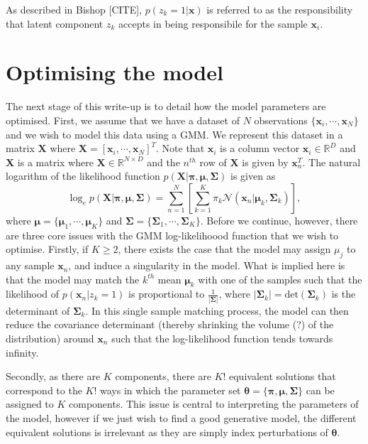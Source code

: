 \documentclass{article}
\begin{document}
As described in Bishop [CITE], $p(z_k = 1\vert \mathbf{x})$ is referred to as the responsibility that latent component $z_k$ accepts in being responsibile for the sample $\mathbf{x}_i$.

\section{Optimising the model}
The next stage of this write-up is to detail how the model parameters are optimised. First, we assume that we have a dataset of $N$ observations $\{\mathbf{x}_i, \cdots, \mathbf{x}_N\}$ and we wish to model this data using a GMM. We represent this dataset in a matrix $\mathbf{X}$ where $\mathbf{X} = \left[ \mathbf{x}_i, \cdots, \mathbf{x}_N \right]^T$. Note that $\mathbf{x}_i$ is a column vector $\mathbf{x}_i \in \mathbb{R}^D$ and $\mathbf{X}$ is a matrix where $\mathbf{X} \in \mathbb{R}^{N \times D}$ and the $n^{th}$ row of $\mathbf{X}$ is given by $\mathbf{x}_n^T$.  The natural logarithm of the likelihood function $p(\mathbf{X}\vert \boldsymbol\pi, \boldsymbol\mu, \boldsymbol\Sigma)$ is given as
\begin{equation}\label{eq:ll_function}
\log_e p(\mathbf{X}\vert \boldsymbol\pi, \boldsymbol\mu, \boldsymbol\Sigma) = \sum_{n = 1}^{N} \left[  \sum_{k=1}^{K} \pi_k \mathcal{N}(\mathbf{x}_n \vert \boldsymbol\mu_k, \boldsymbol\Sigma_k) \right],
\end{equation}
where $\boldsymbol\mu = \{ \boldsymbol\mu_1, \cdots, \boldsymbol\mu_K \}$ and $\boldsymbol\Sigma = \{ \boldsymbol\Sigma_1, \cdots, \boldsymbol\Sigma_K \}$. Before we continue, however, there are three core issues with the GMM log-likelihoood function that we wish to optimise. Firstly, if $K \geq 2$, there exists the case that the model may assign $\mu_j$ to any sample $\mathbf{x}_n$, and induce a singularity in the model. What is implied here is that the model may match the $k^{th}$ mean $\boldsymbol\mu_k$ with one of the samples such that the likelihood of $p(\mathbf{x}_n\vert z_k = 1)$ is proportional to $\frac{1}{\vert \boldsymbol\Sigma \vert}$, where $\vert \boldsymbol\Sigma_k \vert = \text{det}(\boldsymbol\Sigma_k)$ is the determinant of $\boldsymbol\Sigma_k$. In this single sample matching process, the model can then reduce the covariance determinant (thereby shrinking the volume (?) of the distribution) around $\mathbf{x}_n$ such that the log-likelihood function tends towards infinity. 

Secondly, as there are $K$ components, there are $K!$ equivalent solutions that correspond to the $K!$ ways in which the parameter set $\boldsymbol\theta = \{\boldsymbol\pi, \boldsymbol\mu, \boldsymbol\Sigma \}$ can be assigned to $K$ components. This issue is central to interpreting the parameters of the model, however if we just wish to find a good generative model, the different equivalent solutions is irrelevant as they are simply index perturbations of $\boldsymbol\theta$.
\end{document}
